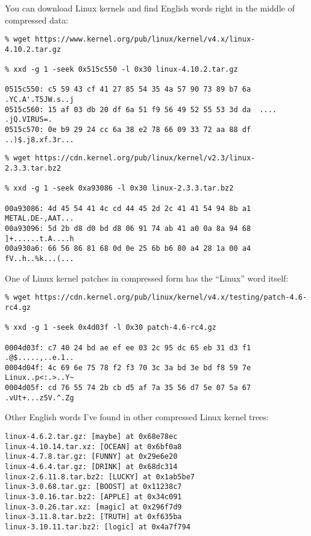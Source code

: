 
You can download Linux kernels and find English words right in the middle of compressed data:

\begin{lstlisting}
% wget https://www.kernel.org/pub/linux/kernel/v4.x/linux-4.10.2.tar.gz

% xxd -g 1 -seek 0x515c550 -l 0x30 linux-4.10.2.tar.gz

0515c550: c5 59 43 cf 41 27 85 54 35 4a 57 90 73 89 b7 6a  .YC.A'.T5JW.s..j
0515c560: 15 af 03 db 20 df 6a 51 f9 56 49 52 55 53 3d da  .... .jQ.VIRUS=.
0515c570: 0e b9 29 24 cc 6a 38 e2 78 66 09 33 72 aa 88 df  ..)$.j8.xf.3r...
\end{lstlisting}

\begin{lstlisting}
% wget https://cdn.kernel.org/pub/linux/kernel/v2.3/linux-2.3.3.tar.bz2

% xxd -g 1 -seek 0xa93086 -l 0x30 linux-2.3.3.tar.bz2

00a93086: 4d 45 54 41 4c cd 44 45 2d 2c 41 41 54 94 8b a1  METAL.DE-,AAT...
00a93096: 5d 2b d8 d0 bd d8 06 91 74 ab 41 a0 0a 8a 94 68  ]+......t.A....h
00a930a6: 66 56 86 81 68 0d 0e 25 6b b6 80 a4 28 1a 00 a4  fV..h..%k...(...
\end{lstlisting}

One of Linux kernel patches in compressed form has the ``Linux'' word itself:

\begin{lstlisting}
% wget https://cdn.kernel.org/pub/linux/kernel/v4.x/testing/patch-4.6-rc4.gz

% xxd -g 1 -seek 0x4d03f -l 0x30 patch-4.6-rc4.gz

0004d03f: c7 40 24 bd ae ef ee 03 2c 95 dc 65 eb 31 d3 f1  .@$.....,..e.1..
0004d04f: 4c 69 6e 75 78 f2 f3 70 3c 3a bd 3e bd f8 59 7e  Linux..p<:.>..Y~
0004d05f: cd 76 55 74 2b cb d5 af 7a 35 56 d7 5e 07 5a 67  .vUt+...z5V.^.Zg
\end{lstlisting}

Other English words I've found in other compressed Linux kernel trees:

\begin{lstlisting}
linux-4.6.2.tar.gz: [maybe] at 0x68e78ec
linux-4.10.14.tar.xz: [OCEAN] at 0x6bf0a8
linux-4.7.8.tar.gz: [FUNNY] at 0x29e6e20
linux-4.6.4.tar.gz: [DRINK] at 0x68dc314
linux-2.6.11.8.tar.bz2: [LUCKY] at 0x1ab5be7
linux-3.0.68.tar.gz: [BOOST] at 0x11238c7
linux-3.0.16.tar.bz2: [APPLE] at 0x34c091
linux-3.0.26.tar.xz: [magic] at 0x296f7d9
linux-3.11.8.tar.bz2: [TRUTH] at 0xf635ba
linux-3.10.11.tar.bz2: [logic] at 0x4a7f794
\end{lstlisting}

